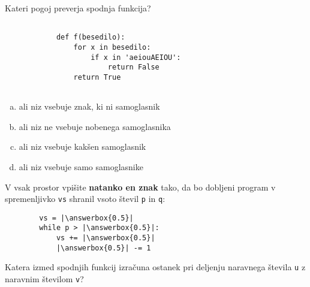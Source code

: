 \documentclass[arhiv, 10pt]{../izpit}
\newcommand{\inlinepy}[1]{\texttt{#1}}
\newcommand{\answerbox}[1]{\framebox{\vphantom{\large M}\hspace{#1cm}}}
\begin{document}
        \naloga*

        \begin{multicols}{2}
        \noindent
        Kateri pogoj preverja spodnja funkcija?
        \begin{verbatim}
        
            def f(besedilo):
                for x in besedilo:
                    if x in 'aeiouAEIOU':
                        return False
                return True
            
        \end{verbatim}

        \begin{enumerate}[(a)]
\item ali niz vsebuje znak, ki ni samoglasnik
\item ali niz ne vsebuje nobenega samoglasnika
\item ali niz vsebuje kakšen samoglasnik
\item ali niz vsebuje samo samoglasnike
\end{enumerate}

        \end{multicols}
    
        \naloga*
        \begin{multicols}{2}
        \noindent
        V vsak prostor vpišite \textbf{natanko en znak} tako, da bo dobljeni program v spremenljivko \inlinepy{vs} shranil vsoto števil \inlinepy{p} in \inlinepy{q}:
        
        \columnbreak
        \begin{verbatim}
        vs = |\answerbox{0.5}|
        while p > |\answerbox{0.5}|:
            vs += |\answerbox{0.5}|
            |\answerbox{0.5}| -= 1
        \end{verbatim}
        \end{multicols}
    
        \clearpage
        \naloga
        
        Katera izmed spodnjih funkcij izračuna ostanek pri deljenju naravnega števila \inlinepy{u} z naravnim številom \inlinepy{v}?
    
\end{document}
